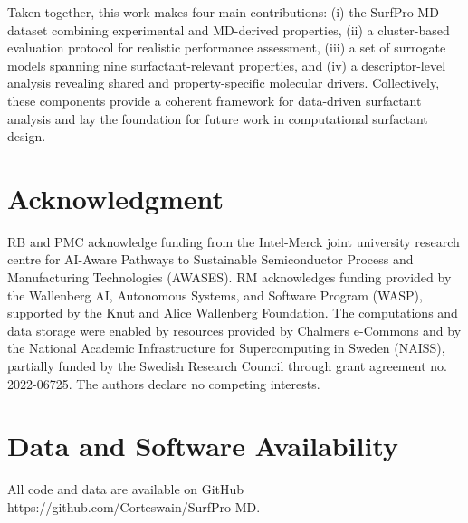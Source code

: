 \documentclass[letterpaper]{article}
\begin{document}
Taken together, this work makes four main contributions: (i) the SurfPro-MD dataset combining experimental and MD-derived properties, (ii) a cluster-based evaluation protocol for realistic performance assessment, (iii) a set of surrogate models spanning nine surfactant-relevant properties, and (iv) a descriptor-level analysis revealing shared and property-specific molecular drivers. Collectively, these components provide a coherent framework for data-driven surfactant analysis and lay the foundation for future work in computational surfactant design.


\section*{Acknowledgment}
RB and PMC acknowledge funding from the Intel-Merck joint university research centre for AI-Aware Pathways to Sustainable Semiconductor Process and Manufacturing Technologies (AWASES). RM acknowledges funding provided by the Wallenberg AI, Autonomous Systems, and Software Program (WASP), supported by the Knut and Alice Wallenberg Foundation. The computations and data storage were enabled by resources provided by Chalmers e-Commons and by the National Academic Infrastructure for Supercomputing in Sweden (NAISS), partially funded by the Swedish Research Council through grant agreement no. 2022-06725. The authors declare no competing interests.


\section*{Data and Software Availability}
All code and data are available on GitHub https://github.com/Corteswain/SurfPro-MD.




\end{document}
